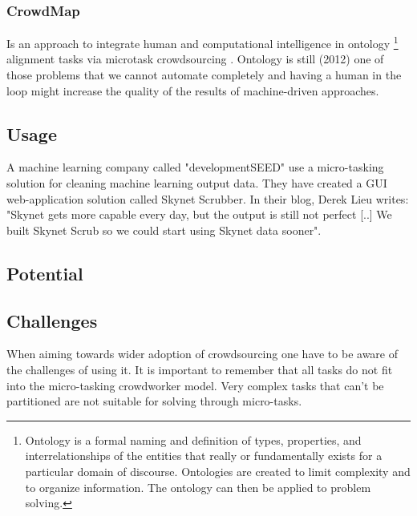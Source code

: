 \subsubsection{CrowdMap}
Is an approach to integrate human and computational intelligence in ontology \footnote{\label{ontology} Ontology is a formal naming and definition of types, properties, and interrelationships of the entities that really or fundamentally exists for a particular domain of discourse. Ontologies are created to limit complexity and to organize information. The ontology can then be applied to problem solving. } alignment tasks via microtask crowdsourcing \citep{Sarasua2012}. Ontology is still (2012) one of those problems that we cannot automate completely and having a human in the loop might increase the quality of the results of machine-driven approaches. 

\subsection{Usage}
 A machine learning company called "developmentSEED" use a micro-tasking solution for cleaning machine learning output data. They have created a GUI web-application solution called Skynet Scrubber. In their blog, Derek Lieu writes: "Skynet gets more capable every day, but the output is still not perfect [..] We built Skynet Scrub so we could start using Skynet data sooner". 
 

 
 \subsection{Potential}

\subsection{Challenges}
When aiming towards wider adoption of crowdsourcing one have to be aware of the challenges of using it. It is important to remember that all tasks do not fit into the micro-tasking crowdworker model. Very complex tasks that can't be partitioned are not suitable for solving through micro-tasks. 
